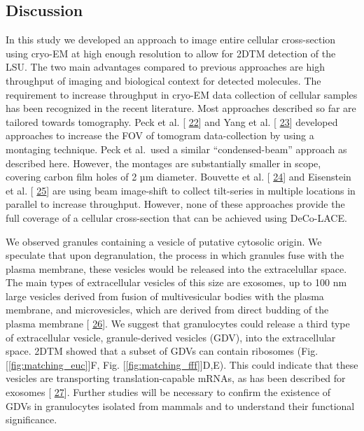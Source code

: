 \documentclass[
]{article}
\providecommand{\DIFaddbegin}{} %
\providecommand{\DIFaddend}{} %
\providecommand{\DIFdelbegin}{} %
\providecommand{\DIFdelend}{} %
\newcommand{\DIFscaledelfig}{0.5}
\newlength{\DIFdelgraphicswidth} %
\newlength{\DIFdelgraphicsheight} %
\newcommand{\DIFaddincludegraphics}[2][]{{\color{blue}\fbox{\DIFOincludegraphics[#1]{#2}}}} %
\newcommand{\DIFdelincludegraphics}[2][]{%
\sbox{\DIFdelgraphicsbox}{\DIFOincludegraphics[#1]{#2}}%
\settoboxwidth{\DIFdelgraphicswidth}{\DIFdelgraphicsbox} %
\settoboxtotalheight{\DIFdelgraphicsheight}{\DIFdelgraphicsbox} %
\scalebox{\DIFscaledelfig}{%
\parbox[b]{\DIFdelgraphicswidth}{\usebox{\DIFdelgraphicsbox}\\[-\baselineskip] \rule{\DIFdelgraphicswidth}{0em}}\llap{\resizebox{\DIFdelgraphicswidth}{\DIFdelgraphicsheight}{%
\setlength{\unitlength}{\DIFdelgraphicswidth}%
\begin{picture}(1,1)%
\thicklines\linethickness{2pt} %
{\color[rgb]{1,0,0}\put(0,0){\framebox(1,1){}}}%
{\color[rgb]{1,0,0}\put(0,0){\line( 1,1){1}}}%
{\color[rgb]{1,0,0}\put(0,1){\line(1,-1){1}}}%
\end{picture}%
}\hspace*{3pt}}} %
} %
\DeclareRobustCommand{\DIFaddbegin}{\DIFOaddbegin \let\includegraphics\DIFaddincludegraphics} %
\DeclareRobustCommand{\DIFaddend}{\DIFOaddend \let\includegraphics\DIFOincludegraphics} %
\DeclareRobustCommand{\DIFdelbegin}{\DIFOdelbegin \let\includegraphics\DIFdelincludegraphics} %
\DeclareRobustCommand{\DIFdelend}{\DIFOaddend \let\includegraphics\DIFOincludegraphics} %
\begin{document}
\hypertarget{discussion}{%
\subsection{Discussion}\label{discussion}}

In this study we developed an approach to image entire cellular
cross-section using cryo-EM at high enough resolution to allow for 2DTM
detection of the LSU. The two main advantages compared to previous
approaches are high throughput of imaging and biological context for
detected molecules. The requirement to increase throughput in cryo-EM
data collection of cellular samples has been recognized in the recent
literature. Most approaches described so far are tailored towards
tomography. Peck et al. {[}\protect\DIFdelbegin %
\DIFdelend \DIFaddbegin \hyperlink{ref-1GPPSX111}{22}{]} \DIFaddend and Yang et al.
{[}\protect\DIFdelbegin %
\DIFdelend \DIFaddbegin \hyperlink{ref-ujizcpVn}{23}{]} \DIFaddend developed approaches to increase the
FOV of tomogram data-collection by using a montaging technique. Peck et
al.~used a similar ``condensed-beam'' approach as described here. However,
the montages are substantially smaller in scope, covering carbon film
holes of 2 µm diameter. Bouvette et al.
{[}\protect\DIFdelbegin %
\DIFdelend \DIFaddbegin \hyperlink{ref-1Gwx5ScUa}{24}{]} \DIFaddend and Eisenstein et al.
{[}\protect\DIFdelbegin %
\DIFdelend \DIFaddbegin \hyperlink{ref-xvouNMBy}{25}{]} \DIFaddend are using beam image-shift to collect
tilt-series in multiple locations in parallel to increase throughput.
However, none of these approaches provide the full coverage of a
cellular cross-section that can be achieved using DeCo-LACE.

We observed granules containing a vesicle of putative cytosolic origin.
We speculate that upon degranulation, the process in which granules fuse
with the plasma membrane, these vesicles would be released into the
extracelullar space. The main types of extracellular vesicles of this
size are exosomes, up to 100 nm large vesicles derived from fusion of
multivesicular bodies with the plasma membrane, and microvesicles, which
are derived from direct budding of the plasma membrane
{[}\protect\DIFdelbegin %
\DIFdelend \DIFaddbegin \hyperlink{ref-kncnYGLD}{26}{]}\DIFaddend . We suggest that granulocytes could release
a third type of extracellular vesicle, granule-derived vesicles (GDV),
into the extracellular space. 2DTM showed that a subset of GDVs can
contain ribosomes (Fig. {[}\ref{fig:matching_euc}{]}F, Fig.
{[}\ref{fig:matching_fff}{]}D,E). This could indicate that these vesicles are
transporting translation-capable mRNAs, as has been described for
exosomes {[}\protect\DIFdelbegin %
\DIFdelend \DIFaddbegin \hyperlink{ref-agVdpX76}{27}{]}\DIFaddend . Further studies will be necessary to
confirm the existence of GDVs in granulocytes isolated from mammals and
to understand their functional significance.
\end{document}
